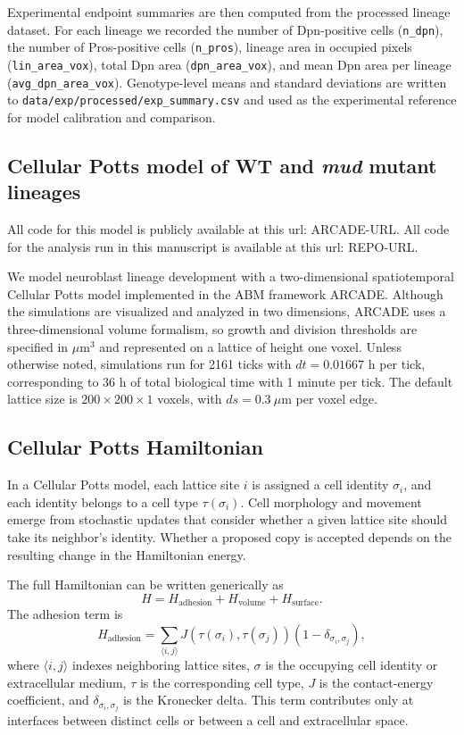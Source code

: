 Experimental endpoint summaries are then computed from the processed lineage dataset.
For each lineage we recorded the number of Dpn-positive cells (\texttt{n\_dpn}), the number of Pros-positive cells (\texttt{n\_pros}), lineage area in occupied pixels (\texttt{lin\_area\_vox}), total Dpn area (\texttt{dpn\_area\_vox}), and mean Dpn area per lineage (\texttt{avg\_dpn\_area\_vox}).
Genotype-level means and standard deviations are written to \texttt{data/exp/processed/exp\_summary.csv} and used as the experimental reference for model calibration and comparison.

\subsection{Cellular Potts model of WT and \textit{mud} mutant lineages}

All code for this model is publicly available at this url: ARCADE-URL.
All code for the analysis run in this manuscript is available at this url: REPO-URL.

We model neuroblast lineage development with a two-dimensional spatiotemporal Cellular Potts model implemented in the ABM framework ARCADE.
Although the simulations are visualized and analyzed in two dimensions, ARCADE uses a three-dimensional volume formalism, so growth and division thresholds are specified in \(\mu\mathrm{m}^3\) and represented on a lattice of height one voxel.
Unless otherwise noted, simulations run for 2161 ticks with \(dt = 0.01667\) h per tick, corresponding to 36 h of total biological time with 1 minute per tick.
The default lattice size is \(200 \times 200 \times 1\) voxels, with \(ds = 0.3~\mu\mathrm{m}\) per voxel edge.

\subsection{Cellular Potts Hamiltonian}

In a Cellular Potts model, each lattice site \(i\) is assigned a cell identity \(\sigma_i\), and each identity belongs to a cell type \(\tau(\sigma_i)\).
Cell morphology and movement emerge from stochastic updates that consider whether a given lattice site should take its neighbor's identity.
Whether a proposed copy is accepted depends on the resulting change in the Hamiltonian energy.

The full Hamiltonian can be written generically as
\[
H = H_{\mathrm{adhesion}} + H_{\mathrm{volume}} + H_{\mathrm{surface}}.
\]
The adhesion term is
\[
H_{\mathrm{adhesion}} = \sum_{\langle i,j \rangle} J\!\left(\tau(\sigma_i),\tau(\sigma_j)\right)\left(1-\delta_{\sigma_i,\sigma_j}\right),
\]
where \(\langle i,j \rangle\) indexes neighboring lattice sites, \(\sigma\) is the occupying cell identity or extracellular medium, \(\tau\) is the corresponding cell type, \(J\) is the contact-energy coefficient, and \(\delta_{\sigma_i,\sigma_j}\) is the Kronecker delta.
This term contributes only at interfaces between distinct cells or between a cell and extracellular space.

